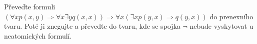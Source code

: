 \subsubsection{}
Převeďte formuli $(\forall x p(x,y) \Rightarrow \forall x \exists y q(x,x))
\Rightarrow \forall x (\exists x p(y,x) \Rightarrow q(y,x))$ do prenexního
tvaru. Poté ji znegujte a převedte do tvaru, kde se spojka $\neg$ nebude
vyskytovat u neatomických formulí.
